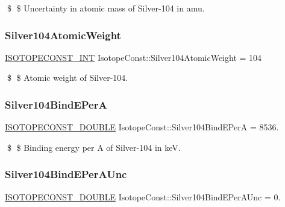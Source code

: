 \$ \$ Uncertainty in atomic mass of Silver-\/104 in amu. \mbox{\label{group___isotope_const-_silver-_ag104_ga3d0ea313ed64ca13c5486f54e72536b9}} 
\subsubsection{\texorpdfstring{Silver104\+Atomic\+Weight}{Silver104AtomicWeight}}
{\footnotesize\ttfamily \mbox{\hyperlink{group___isotope_const-_macros_ga5f18360b3e99483a35c32d789e62621c}{I\+S\+O\+T\+O\+P\+E\+C\+O\+N\+S\+T\+\_\+\+I\+NT}} Isotope\+Const\+::\+Silver104\+Atomic\+Weight = 104}

\$ \$ Atomic weight of Silver-\/104. \mbox{\label{group___isotope_const-_silver-_ag104_ga42643bc9ef9ee4f63fcded7559030d1e}} 
\subsubsection{\texorpdfstring{Silver104\+Bind\+E\+PerA}{Silver104BindEPerA}}
{\footnotesize\ttfamily \mbox{\hyperlink{group___isotope_const-_macros_ga8f45a7272ce02c0b4c65c44636ed719a}{I\+S\+O\+T\+O\+P\+E\+C\+O\+N\+S\+T\+\_\+\+D\+O\+U\+B\+LE}} Isotope\+Const\+::\+Silver104\+Bind\+E\+PerA = 8536.}

\$ \$ Binding energy per A of Silver-\/104 in keV. \mbox{\label{group___isotope_const-_silver-_ag104_ga379a95d0a9771c3fca4d8b4009828add}} 
\subsubsection{\texorpdfstring{Silver104\+Bind\+E\+Per\+A\+Unc}{Silver104BindEPerAUnc}}
{\footnotesize\ttfamily \mbox{\hyperlink{group___isotope_const-_macros_ga8f45a7272ce02c0b4c65c44636ed719a}{I\+S\+O\+T\+O\+P\+E\+C\+O\+N\+S\+T\+\_\+\+D\+O\+U\+B\+LE}} Isotope\+Const\+::\+Silver104\+Bind\+E\+Per\+A\+Unc = 0.}

